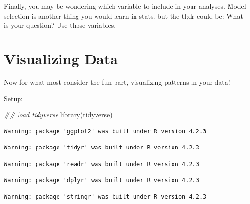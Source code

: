 \documentclass[
  letterpaper,
  DIV=11,
  numbers=noendperiod]{scrreprt}
\newenvironment{Shaded}{\begin{snugshade}}{\end{snugshade}}
\newcommand{\DocumentationTok}[1]{\textcolor[rgb]{0.37,0.37,0.37}{\textit{#1}}}
\newcommand{\FunctionTok}[1]{\textcolor[rgb]{0.28,0.35,0.67}{#1}}
\newcommand{\NormalTok}[1]{\textcolor[rgb]{0.00,0.23,0.31}{#1}}
\begin{document}
Finally, you may be wondering which variable to include in your
analyses. Model selection is another thing you would learn in stats, but
the tl;dr could be: What is your question? Use those variables.

\chapter{Visualizing Data}\label{visualizing-data}

Now for what most consider the fun part, visualizing patterns in your
data!

Setup:

\begin{Shaded}
\begin{Highlighting}[]
\DocumentationTok{\#\# load tidyverse}
\FunctionTok{library}\NormalTok{(tidyverse)}
\end{Highlighting}
\end{Shaded}

\begin{verbatim}
Warning: package 'ggplot2' was built under R version 4.2.3
\end{verbatim}

\begin{verbatim}
Warning: package 'tidyr' was built under R version 4.2.3
\end{verbatim}

\begin{verbatim}
Warning: package 'readr' was built under R version 4.2.3
\end{verbatim}

\begin{verbatim}
Warning: package 'dplyr' was built under R version 4.2.3
\end{verbatim}

\begin{verbatim}
Warning: package 'stringr' was built under R version 4.2.3
\end{verbatim}
\end{document}
